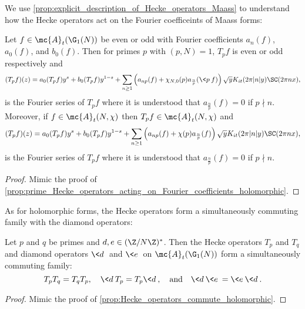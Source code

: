     We use \cref{prop:explicit_description_of_Hecke_operators_Maass} to understand how the Hecke operators act on the Fourier coefficeints of Maass forms:

    \begin{proposition}\label{prop:prime_Hecke_operators_acting_on_Fourier_coefficients_Maass}
      Let $f \in \mc{A}_{t}(\G_{1}(N))$ be even or odd with Fourier coefficients $a_{n}(f)$, $a_{0}(f)$, and $b_{0}(f)$. Then for primes $p$ with $(p,N) = 1$, $T_{p}f$ is even or odd respectively and
      \[
        (T_{p}f)(z) = a_{0}(T_{p}f)y^{s}+b_{0}(T_{p}f)y^{1-s}+\sum_{n \ge 1}\left(a_{np}(f)+\chi_{N,0}(p)a_{\frac{n}{p}}(\<p\>f)\right)\sqrt{y}K_{it}(2\pi|n|y)\SC(2\pi nx),
      \]
      is the Fourier series of $T_{p}f$ where it is understood that $a_{\frac{n}{p}}(f) = 0$ if $p \nmid n$. Moreover, if $f \in \mc{A}_{t}(N,\chi)$ then $T_{p}f \in \mc{A}_{t}(N,\chi)$ and
      \[
        (T_{p}f)(z) = a_{0}(T_{p}f)y^{s}+b_{0}(T_{p}f)y^{1-s}+\sum_{n \ge 1}\left(a_{np}(f)+\chi(p)a_{\frac{n}{p}}(f)\right)\sqrt{y}K_{it}(2\pi|n|y)\SC(2\pi nx),
      \]
      is the Fourier series of $T_{p}f$ where it is understood that $a_{\frac{n}{p}}(f) = 0$ if $p \nmid n$.
    \end{proposition}
    \begin{proof}
      Mimic the proof of \cref{prop:prime_Hecke_operators_acting_on_Fourier_coefficients_holomorphic}.
    \end{proof}

    As for holomorphic forms, the Hecke operators form a simultaneously commuting family with the diamond operators:

    \begin{proposition}\label{prop:Hecke_operators_commute_Maass}
      Let $p$ and $q$ be primes and $d,e \in (\Z/N\Z)^{\ast}$. Then the Hecke operators $T_{p}$ and $T_{q}$ and diamond operators $\<d\>$ and $\<e\>$ on $\mc{A}_{t}(\G_{1}(N))$ form a simultaneously commuting family:
      \[
        T_{p}T_{q} = T_{q}T_{p}, \quad \<d\>T_{p} = T_{p}\<d\>, \quad \text{and} \quad \<d\>\<e\> = \<e\>\<d\>.
      \]
    \end{proposition}
    \begin{proof}
      Mimic the proof of \cref{prop:Hecke_operators_commute_holomorphic}.
    \end{proof}

